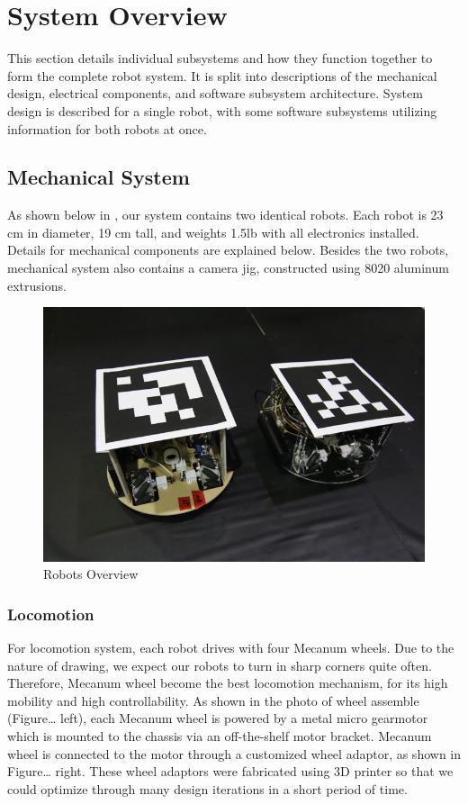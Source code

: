 \section{System Overview}
\label{sec:system_overview}

This section details individual subsystems and how they function together to form the complete robot system. It is split into descriptions of the mechanical design, electrical components, and software subsystem architecture. System design is described for a single robot, with some software subsystems utilizing information for both robots at once.

\subsection{Mechanical System}
\label{sec:mechanical}
As shown below in , our system contains two identical robots. Each robot is 23 cm in diameter, 19 cm tall, and weights 1.5lb with all electronics installed. Details for mechanical components are explained below. Besides the two robots, mechanical system also contains a camera jig, constructed using 8020 aluminum extrusions. 

\begin{figure}[h!]
\centering
\includegraphics[width=0.98\columnwidth]{figs/full_system.png}
\caption{Robots Overview}
\label{fig:so1}
\end{figure}

\subsubsection{Locomotion}
\label{sec:me_locomotion}
For locomotion system, each robot drives with four Mecanum wheels. Due to the nature of drawing, we expect our robots to turn in sharp corners quite often. Therefore, Mecanum wheel become the best locomotion mechanism, for its high mobility and high controllability. As shown in the photo of wheel assemble (Figure… left), each Mecanum wheel is powered by a metal micro gearmotor which is mounted to the chassis via an off-the-shelf motor bracket. Mecanum wheel is connected to the motor through a customized wheel adaptor, as shown in Figure… right. These wheel adaptors were fabricated using 3D printer so that we could optimize through many design iterations in a short period of time.


